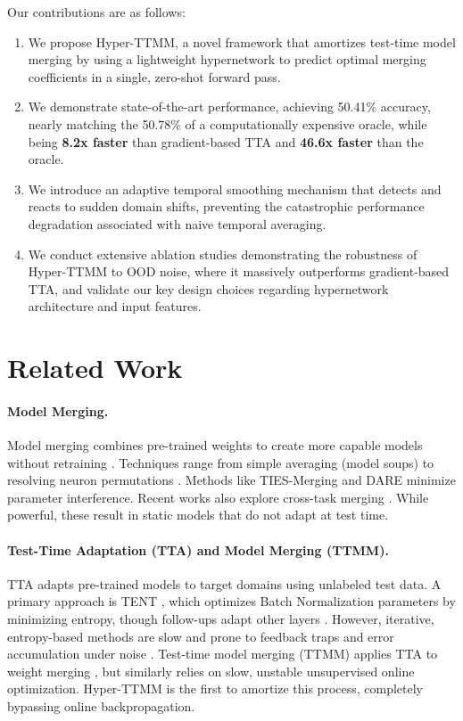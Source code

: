\documentclass{article}
\theoremstyle{plain}
\theoremstyle{definition}
\theoremstyle{remark}
\begin{document}
Our contributions are as follows:
\begin{enumerate}
    \item We propose Hyper-TTMM, a novel framework that amortizes test-time model merging by using a lightweight hypernetwork to predict optimal merging coefficients in a single, zero-shot forward pass.
    \item We demonstrate state-of-the-art performance, achieving 50.41\% accuracy, nearly matching the 50.78\% of a computationally expensive oracle, while being \textbf{8.2x faster} than gradient-based TTA and \textbf{46.6x faster} than the oracle.
    \item We introduce an adaptive temporal smoothing mechanism that detects and reacts to sudden domain shifts, preventing the catastrophic performance degradation associated with naive temporal averaging.
    \item We conduct extensive ablation studies demonstrating the robustness of Hyper-TTMM to OOD noise, where it massively outperforms gradient-based TTA, and validate our key design choices regarding hypernetwork architecture and input features.
\end{enumerate}

\section{Related Work}
\label{sec:related_work}

\paragraph{Model Merging.}
Model merging combines pre-trained weights to create more capable models without retraining \citep{jin2024modelmerging}. Techniques range from simple averaging (model soups) \citep{wortsman2022model} to resolving neuron permutations \citep{singh2020model, entezari2022the, ainslie2023merging}. Methods like TIES-Merging \citep{yadav2023ties} and DARE \citep{yu2023dare} minimize parameter interference. Recent works also explore cross-task merging \citep{da2023zipit, stoica2024zip}. While powerful, these result in static models that do not adapt at test time.

\paragraph{Test-Time Adaptation (TTA) and Model Merging (TTMM).}
TTA adapts pre-trained models to target domains using unlabeled test data. A primary approach is TENT \citep{wang2021tent}, which optimizes Batch Normalization parameters by minimizing entropy, though follow-ups adapt other layers \citep{zhang2022memo, liang2023fully}. However, iterative, entropy-based methods are slow and prone to feedback traps and error accumulation under noise \citep{pmlr-v162-karim22a, schneider2020improving}. Test-time model merging (TTMM) applies TTA to weight merging \citep{goyal2023reduce}, but similarly relies on slow, unstable unsupervised online optimization. Hyper-TTMM is the first to amortize this process, completely bypassing online backpropagation.
\end{document}
